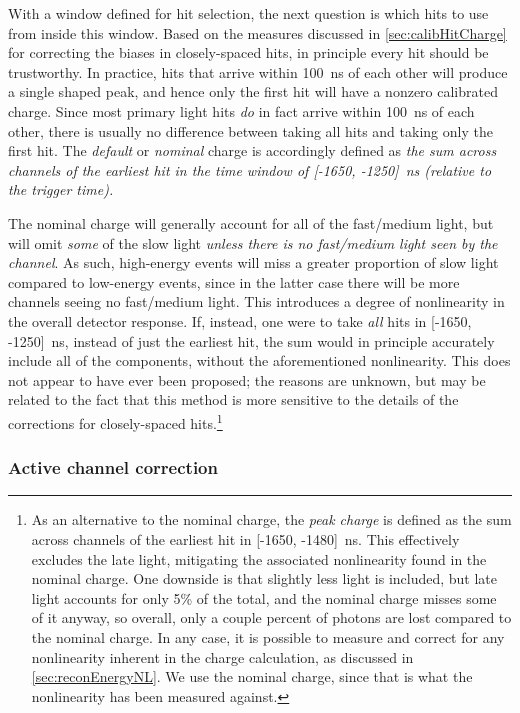 \documentclass[../thesis.tex]{subfiles}
\begin{document}
With a window defined for hit selection, the next question is which hits to use from inside this window. Based on the measures discussed in \autoref{sec:calibHitCharge} for correcting the biases in closely-spaced hits, in principle every hit should be trustworthy. In practice, hits that arrive within 100~ns of each other will produce a single shaped peak, and hence only the first hit will have a nonzero calibrated charge. Since most primary light hits \emph{do} in fact arrive within 100~ns of each other, there is usually no difference between taking all hits and taking only the first hit. The \emph{default} or \emph{nominal} charge is accordingly defined as \emph{the sum across channels of the earliest hit in the time window of [-1650, -1250]~ns (relative to the trigger time).}

The nominal charge will generally account for all of the fast/medium light, but will omit \emph{some} of the slow light \emph{unless there is no fast/medium light seen by the channel}. As such, high-energy events will miss a greater proportion of slow light compared to low-energy events, since in the latter case there will be more channels seeing no fast/medium light. This introduces a degree of nonlinearity in the overall detector response. If, instead, one were to take \emph{all} hits in [-1650, -1250]~ns, instead of just the earliest hit, the sum would in principle accurately include all of the components, without the aforementioned nonlinearity. This does not appear to have ever been proposed; the reasons are unknown, but may be related to the fact that this method is more sensitive to the details of the corrections for closely-spaced hits.\footnote{%
As an alternative to the nominal charge, the \emph{peak charge} is defined as the sum across channels of the earliest hit in [-1650, -1480]~ns. This effectively excludes the late light, mitigating the associated nonlinearity found in the nominal charge. One downside is that slightly less light is included, but late light accounts for only 5\% of the total, and the nominal charge misses some of it anyway, so overall, only a couple percent of photons are lost compared to the nominal charge. In any case, it is possible to measure and correct for any nonlinearity inherent in the charge calculation, as discussed in \autoref{sec:reconEnergyNL}. We use the nominal charge, since that is what the nonlinearity has been measured against.%
}


\subsubsection{Active channel correction}
\label{sec:reconActiveChan}
\end{document}
